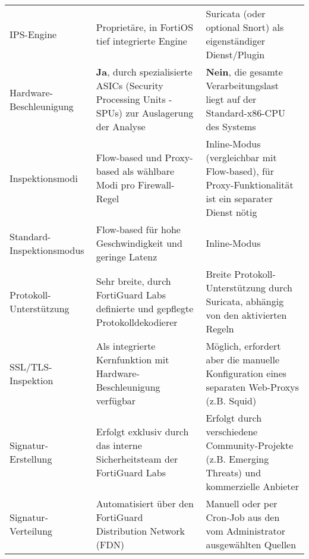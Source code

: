 \begin{longtable}{>{\RaggedRight}p{} >{\RaggedRight}p{} >{\RaggedRight}p{}}
	\multicolumn{3}{l}{\textbf{II. Technische Implementierung des IPS}} \\
	\midrule
	IPS-Engine & Proprietäre, in FortiOS tief integrierte Engine & Suricata (oder optional Snort) als eigenständiger Dienst/Plugin \\
	\addlinespace
	Hardware-Beschleunigung & \textbf{Ja}, durch spezialisierte ASICs (Security Processing Units - SPUs) zur Auslagerung der Analyse & \textbf{Nein}, die gesamte Verarbeitungslast liegt auf der Standard-x86-CPU des Systems \\
	\addlinespace
	Inspektionsmodi & Flow-based und Proxy-based als wählbare Modi pro Firewall-Regel & Inline-Modus (vergleichbar mit Flow-based), für Proxy-Funktionalität ist ein separater Dienst nötig \\
	\addlinespace
	Standard-Inspektionsmodus & Flow-based für hohe Geschwindigkeit und geringe Latenz & Inline-Modus \\
	\addlinespace
	Protokoll-Unterstützung & Sehr breite, durch FortiGuard Labs definierte und gepflegte Protokolldekodierer & Breite Protokoll-Unterstützung durch Suricata, abhängig von den aktivierten Regeln \\
	\addlinespace
	SSL/TLS-Inspektion & Als integrierte Kernfunktion mit Hardware-Beschleunigung verfügbar & Möglich, erfordert aber die manuelle Konfiguration eines separaten Web-Proxys (z.B. Squid) \\
	\addlinespace
	Signatur-Erstellung & Erfolgt exklusiv durch das interne Sicherheitsteam der FortiGuard Labs & Erfolgt durch verschiedene Community-Projekte (z.B. Emerging Threats) und kommerzielle Anbieter \\
	\addlinespace
	Signatur-Verteilung & Automatisiert über den FortiGuard Distribution Network (FDN) & Manuell oder per Cron-Job aus den vom Administrator ausgewählten Quellen \\
	\midrule
	

\end{longtable}
